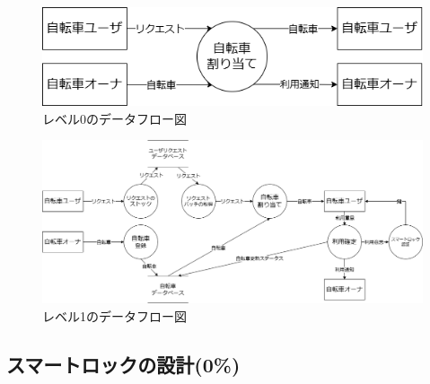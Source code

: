           \begin{figure}[htbp]
            \centering
            \includegraphics[scale=0.4]
            {figures/dfd-level0.drawio.png}
            \caption{レベル0のデータフロー図}
            \label{fig:レベル0のデータフロー図}
          \end{figure}

          \begin{figure}[htbp]
            \centering
            \includegraphics[scale=0.4]
            {figures/dfd-level1.drawio.png}
            \caption{レベル1のデータフロー図}
            \label{fig:レベル1のデータフロー図}
          \end{figure}

  \subsection{スマートロックの設計(0\%)}
    \label{sec:スマートロックの設計}
      \par
      
